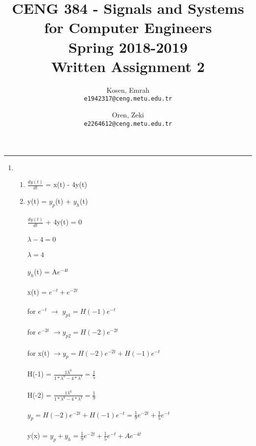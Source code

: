 \documentclass[10pt,a4paper, margin=1in]{article}
\author{
  Kosen, Emrah\\
  \texttt{e1942317@ceng.metu.edu.tr}
  \and
  Oren, Zeki\\
  \texttt{e2264612@ceng.metu.edu.tr}
}
\title{CENG 384 - Signals and Systems for Computer Engineers \\
Spring 2018-2019 \\
Written Assignment 2}
\begin{document}
\maketitle



\noindent\rule{19cm}{1.2pt}

\begin{enumerate}

\item

    \begin{enumerate}
    \item %
        $\frac{dy(t)}{dt}$ = x(t) - 4y(t)



    \item 
    
    y(t) = $y_{p}$(t) + $y_{h}$(t)\\\\
    $\frac{dy(t)}{dt}$ + 4y(t) = 0\\\\
    $\lambda - 4 = 0$\\\\
    $\lambda  = 4 $\\\\
    $y_{h}$(t) = A$e^{-4t}$ \\\\
    x(t) = $e^{-t} + e^{-2t}$\\\\
    for $e^{-t}$  $\rightarrow $ $ y_{p1} = H(-1)e^{-t} $\\\\
    for $e^{-2t}$  $\rightarrow y_{p2} = H(-2)e^{-2t} $\\\\
    for x(t) $ \rightarrow  y_{p} = H(-2)e^{-2t} + H(-1)e^{-t} $\\\\
    H(-1) = $\frac{1 \lambda^0}{1*\lambda^0 - 4*\lambda^1}  = \frac{1}{5}$\\\\
    H(-2) = $\frac{1 \lambda^0}{1*\lambda^0 - 4*\lambda^1}  = \frac{1}{9}$\\\\
    $y_{p} = H(-2)e^{-2t} + H(-1)e^{-t}  = \frac{1}{9}e^{-2t} + \frac{1}{5}e^{-t} $\\\\
    y(x) = $y_{p} + y_{h} = \frac{1}{9}e^{-2t} + \frac{1}{5}e^{-t} +  Ae^{-4t}$\\\\\\
    

\end{enumerate}
\end{enumerate}
\end{document}
